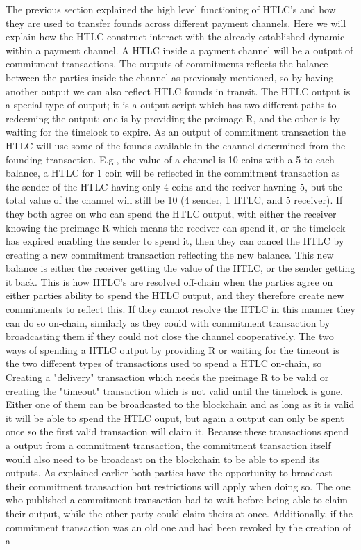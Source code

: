 The previous section explained the high level functioning of HTLC's and how they are used to transfer founds across different payment channels.
Here we will explain how the HTLC construct interact with the already established dynamic within a payment channel.
A HTLC inside a payment channel will be a output of commitment transactions. The outputs of commitments reflects the balance between the parties inside the channel as previously mentioned, so by having another output we can also reflect HTLC founds in transit. The HTLC output is a special type of output; it is a output script which has two different paths to redeeming the output: one is by providing the preimage R, and the other is by waiting for the timelock to expire. 
As an output of commitment transaction the HTLC will use some of the founds available in the channel determined from the founding transaction. E.g., the value of a channel is 10 coins with a 5 to each balance, a HTLC for 1 coin will be reflected in the commitment transaction as the sender of the HTLC having only 4 coins and the reciver havning 5, but the total value of the channel will still be 10 (4 sender, 1 HTLC, and 5 receiver). If they both agree on who can spend the HTLC output, with either the receiver knowing the preimage R which means the receiver can spend it, or the timelock has expired enabling the sender to spend it, then they can cancel the HTLC by creating a new commitment transaction reflecting the new balance. 
This new balance is either the receiver getting the value of the HTLC, or the sender getting it back. This is how HTLC's are resolved off-chain when the parties agree on either parties ability to spend the HTLC output, and they therefore create new commitments to reflect this. If they cannot resolve the HTLC in this manner they can do so on-chain, similarly as they could with commitment transaction by broadcasting them if they could not close the channel cooperatively. 
The two ways of spending a HTLC output by providing R or waiting for the timeout is the two different types of transactions used to spend a HTLC on-chain, so Creating a "delivery" transaction which needs the preimage R to be valid or creating the "timeout" transaction which is not valid until the timelock is gone. Either one of them can be broadcasted to the blockchain and as long as it is valid it will be able to spend the HTLC ouput, but again a output can only be spent once so the first valid transaction will claim it. Because these transactions spend a output from a commitment transaction, the commitment transaction itself would also need to be broadcast on the blockchain to be able to spend its outputs. As explained earlier both parties have the opportunity to broadcast their commitment transaction but restrictions will apply when doing so. The one who published a commitment transaction had to wait before being able to claim their output, while the other party could claim theirs at once. Additionally, if the commitment transaction was an old one and had been revoked by the creation of a 
